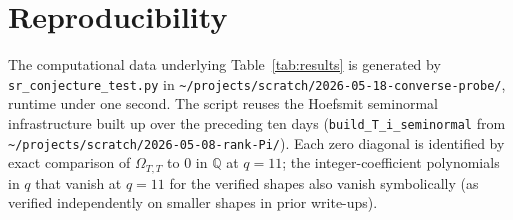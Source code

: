 \documentclass[11pt]{article}
\theoremstyle{definition}
\newcommand{\Om}{\Omega}
\newcommand{\QQ}{\mathbb{Q}}
\begin{document}
\section{Reproducibility}

The computational data underlying Table~\ref{tab:results} is generated
by \texttt{sr\_conjecture\_test.py} in
\texttt{\textasciitilde/projects/scratch/2026-05-18-converse-probe/},
runtime under one second. The script reuses the Hoefsmit seminormal
infrastructure built up over the preceding ten days
(\texttt{build\_T\_i\_seminormal} from
\texttt{\textasciitilde/projects/scratch/2026-05-08-rank-Pi/}). Each
zero diagonal is identified by exact comparison of $\Om_{T,T}$ to $0$
in $\QQ$ at $q = 11$; the integer-coefficient polynomials in $q$ that
vanish at $q = 11$ for the verified shapes also vanish symbolically (as
verified independently on smaller shapes in prior write-ups).
\end{document}
